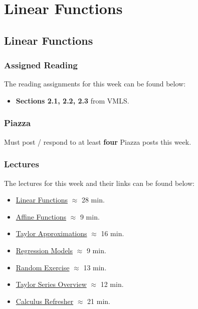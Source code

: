 \clearpage

\renewcommand{\ChapTitle}{Linear Functions}
\renewcommand{\SectionTitle}{Linear Functions}

\chapter{\ChapTitle}
\section{\SectionTitle}

\subsection{Assigned Reading}

The reading assignments for this week can be found below:

\begin{itemize}
    \item \textbf{Sections 2.1, 2.2, 2.3} from VMLS.
\end{itemize}

\subsection{Piazza}

Must post / respond to at least \textbf{four} Piazza posts this week.  

\subsection{Lectures}

The lectures for this week and their links can be found below:

\begin{itemize}
    \item \href{https://applied.cs.colorado.edu/mod/hvp/view.php?id=50678}{Linear Functions} $\approx$ 28 min.
    \item \href{https://applied.cs.colorado.edu/mod/hvp/view.php?id=50679}{Affine Functions} $\approx$ 9 min.
    \item \href{https://applied.cs.colorado.edu/mod/hvp/view.php?id=50680}{Taylor Approximations} $\approx$ 16 min.
    \item \href{https://applied.cs.colorado.edu/mod/hvp/view.php?id=50681}{Regression Models} $\approx$ 9 min.
    \item \href{https://applied.cs.colorado.edu/mod/hvp/view.php?id=50682}{Random Exercise} $\approx$ 13 min.
    \item \href{https://www.youtube.com/watch?v=eX1hvWxmJVE}{Taylor Series Overview} $\approx$ 12 min.
    \item \href{https://applied.cs.colorado.edu/mod/hvp/view.php?id=50684}{Calculus Refresher} $\approx$ 21 min.
\end{itemize}

